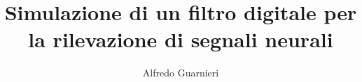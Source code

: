 \begin{ThesisTitlePage}

\author{Alfredo Guarnieri}
\title{Simulazione di un filtro digitale per la rilevazione di segnali neurali}
%

\end{ThesisTitlePage}
